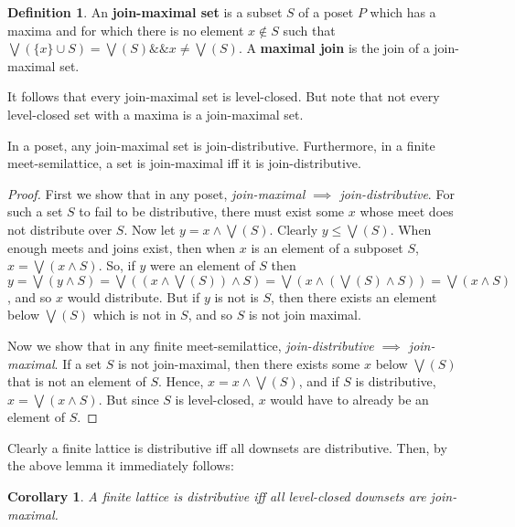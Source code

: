 \documentclass[hoptionsi,review,format=sigplan]{acmart}
\newtheorem*{corollary}{Corollary}
\theoremstyle{definition}
\newtheorem{definition}{Definition}[section]
\begin{document}
\begin{definition}
An \textbf{join-maximal set} is a subset \(S\) of a poset \(P\) which has a maxima and for which there is no element \(x \notin S\) such that \(\bigvee(\{x\} \cup S) = \bigvee(S) \mathbin{\&\&} x \neq \bigvee(S)\). A \textbf{maximal join} is the join of a join-maximal set.
\end{definition}

It follows that every join-maximal set is level-closed. But note that not every level-closed set with a maxima is a join-maximal set.

\begin{lemma}
In a poset, any join-maximal set is join-distributive. Furthermore, in a finite meet-semilattice, a set is join-maximal iff it is join-distributive.
\end{lemma}
\begin{proof}

First we show that in any poset, \textit{join-maximal \(\implies\) join-distributive}. For such a set \(S\) to fail to be distributive, there must exist some \(x\) whose meet does not distribute over \(S\). Now let \(y = x \wedge \bigvee(S)\). Clearly \(y \leq \bigvee(S)\). When enough meets and joins exist, then when \(x\) is an element of a subposet \(S\), \(x = \bigvee(x \wedge S)\). So, if \(y\) were an element of \(S\) then \(y = \bigvee(y \wedge S) = \bigvee((x \wedge \bigvee(S)) \wedge S)  =  \bigvee(x \wedge (\bigvee(S) \wedge S)) = \bigvee(x \wedge S)\), and so \(x\) would distribute. But if \(y\) is not is \(S\), then there exists an element below \(\bigvee(S)\) which is not in \(S\), and so \(S\) is not join maximal.

Now we show that in any finite meet-semilattice, \textit{join-distributive \(\implies\) join-maximal}. If a set \(S\) is not join-maximal, then there exists some \(x\) below \(\bigvee(S)\) that is not an element of \(S\). Hence, \(x = x \wedge \bigvee(S)\), and if \(S\) is distributive, \(x = \bigvee(x \wedge S)\).  But since \(S\) is level-closed, \(x\) would have to already be an element of \(S\).

\end{proof}

Clearly a finite lattice is distributive iff all downsets are distributive. Then, by the above lemma it immediately follows:

\begin{corollary}
A finite lattice is distributive iff all level-closed downsets are join-maximal.
\end{corollary}
\end{document}
